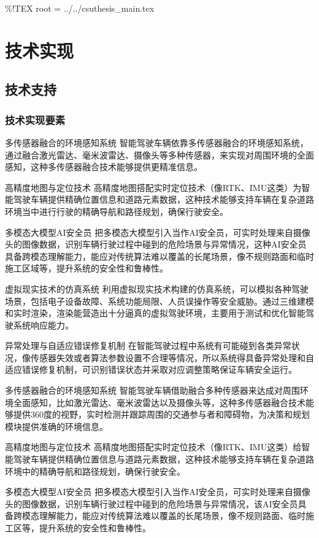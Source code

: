 \%!TEX root = ../../csuthesis\_main.tex

\chapter{技术实现}

\section{技术支持}

\subsection{技术实现要素}
多传感器融合的环境感知系统
智能驾驶车辆依靠多传感器融合的环境感知系统，通过融合激光雷达、毫米波雷达、摄像头等多种传感器，来实现对周围环境的全面感知，这种多传感器融合技术能够提供更精准信息。 ​


高精度地图与定位技术
高精度地图搭配实时定位技术（像RTK、IMU这类）为智能驾驶车辆提供精确位置信息和道路元素数据，这种技术能够支持车辆在复杂道路环境当中进行行驶的精确导航和路径规划，确保行驶安全。 ​


多模态大模型AI安全员
把多模态大模型引入当作AI安全员，可实时处理来自摄像头的图像数据，识别车辆行驶过程中碰到的危险场景与异常情况，这种AI安全员具备跨模态理解能力，能应对传统算法难以覆盖的长尾场景，像不规则路面和临时施工区域等，提升系统的安全性和鲁棒性。 ​


虚拟现实技术的仿真系统
利用虚拟现实技术构建的仿真系统，可以模拟各种驾驶场景，包括电子设备故障、系统功能局限、人员误操作等安全威胁。​通过三维建模和实时渲染，渲染能营造出十分逼真的虚拟驾驶环境，主要用于测试和优化智能驾驶系统响应能力。

异常处理与自适应错误修复机制
在智能驾驶过程中系统有可能碰到各类异常状况，像传感器失效或者算法参数设置不合理等情况，所以系统得具备异常处理和自适应错误修复机制，可识别错误状态并采取对应调整策略保证车辆安全运行。

多传感器融合的环境感知系统
智能驾驶车辆借助融合多种传感器来达成对周围环境全面感知，比如激光雷达、毫米波雷达以及摄像头等，这种多传感器融合技术能够提供360度的视野，实时检测并跟踪周围的交通参与者和障碍物，为决策和规划模块提供准确的环境信息。 ​

高精度地图与定位技术
高精度地图搭配实时定位技术（像RTK、IMU这类）给智能驾驶车辆提供精确位置信息与道路元素数据，这种技术能够支持车辆在复杂道路环境中的精确导航和路径规划，确保行驶安全。 ​

多模态大模型AI安全员
把多模态大模型引入当作AI安全员，可实时处理来自摄像头的图像数据，识别车辆行驶过程中碰到的危险场景与异常情况，该AI安全员具备跨模态理解能力，能应对传统算法难以覆盖的长尾场景，像不规则路面、临时施工区等，提升系统的安全性和鲁棒性。 ​

